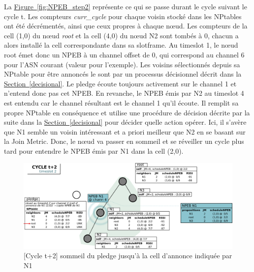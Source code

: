 \documentclass[]{report}
\newcommand{\wordlink}[2]{\hyperref[#2]{#1~\ref{#2}}}
\begin{document}
\newpage

La \wordlink{Figure}{fig:NPEB_step2} représente ce qui se passe durant le cycle suivant le cycle t. Les compteurs \textit{curr\_cycle} pour chaque voisin stocké dans les NPtables ont été décrémentés, ainsi que ceux propres à chaque nœud. Les compteurs de la cell (1,0) du nœud \textit{root} et la cell (4,0) du nœud N2 sont tombés à 0, chacun a alors installé la cell correspondante dans sa slotframe. Au timeslot 1, le nœud root émet donc un NPEB à un channel offset de 0, qui correspond au channel 6 pour l'ASN courant (valeur pour l'exemple). Les voisins sélectionnés depuis sa NPtable pour être annoncés le sont par un processus décisionnel décrit dans la \wordlink{Section}{decisional}. Le pledge écoute toujours activement sur le channel 1 et n'entend donc pas cet NPEB. En revanche, le NPEB émis par N2 au timeslot 4 est entendu car le channel résultant est le channel 1 qu'il écoute. Il remplit sa propre NPtable en conséquence et utilise une procédure de décision décrite par la suite dans la \wordlink{Section}{decisional} pour décider quelle action opérer. Ici, il s'avère que N1 semble un voisin intéressant et a priori meilleur que N2 en se basant sur la Join Metric. Donc, le nœud va passer en sommeil et se réveiller un cycle plus tard pour entendre le NPEB émis par N1 dans la cell (2,0).

 \vspace{1cm}
	\begin{figure}[!h]
	\centering
	\includegraphics[width=\linewidth]{NPEB_step3}
	\caption{[Cycle t+2] sommeil du pledge jusqu'à la cell d'annonce indiquée par N1}
	\label{fig:NPEB_step3}
	\end{figure}
\vspace{0.4cm}
\end{document}
